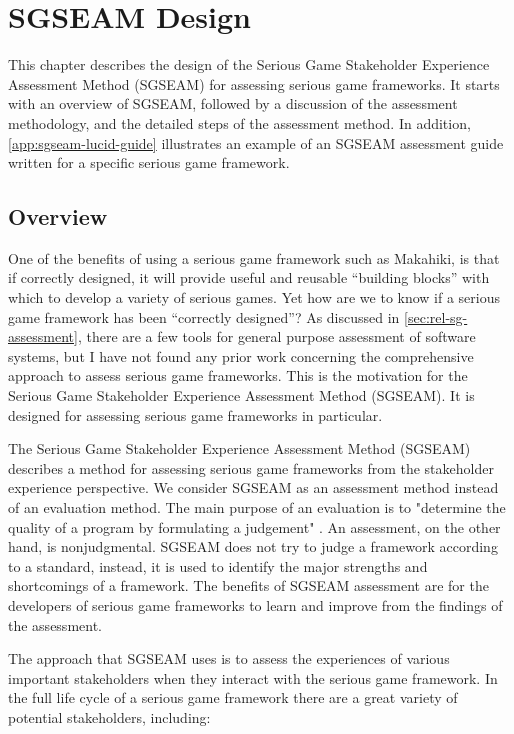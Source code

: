 \chapter{SGSEAM Design}
\label{cha:sgseam-design}

This chapter describes the design of the Serious Game Stakeholder Experience 
Assessment Method (SGSEAM) for assessing serious game frameworks. It starts with an overview of SGSEAM, followed by a discussion of the assessment methodology, and the detailed steps of the assessment method. In addition, \autoref {app:sgseam-lucid-guide} illustrates an example of an SGSEAM assessment guide written for a specific serious game framework.

\section{Overview}

One of the benefits of using a serious game framework such as Makahiki, is that if correctly designed, it will provide useful and reusable ``building blocks'' with which to develop a variety of serious games. Yet how are we to know if a serious game framework has been ``correctly designed''? As discussed in \autoref{sec:rel-sg-assessment}, there are a few tools for general purpose assessment of software systems, but I have not found any prior work concerning the comprehensive approach to assess serious game frameworks. This is the motivation for the Serious Game Stakeholder Experience 
Assessment Method (SGSEAM). It is designed for assessing serious game frameworks in particular.

The Serious Game Stakeholder Experience Assessment Method (SGSEAM) describes a method for 
assessing serious game frameworks from the stakeholder 
experience perspective.  We consider
SGSEAM as an assessment method instead of an evaluation method. The main purpose of an
evaluation is to "determine the quality of a program by formulating a judgement"
\cite{hurteau2009legitimate}. An assessment, on the other hand, is nonjudgmental. SGSEAM does
not try to judge a framework according to a standard, instead, it is used to identify the major
strengths and shortcomings of a framework.
The benefits of SGSEAM assessment are for the developers of serious game frameworks 
to learn and improve from the findings of the assessment.

The approach that SGSEAM uses is to assess the experiences of various important stakeholders when
they interact with the serious game framework. In the full life cycle of a serious game framework
there are a great variety of potential stakeholders, including:

